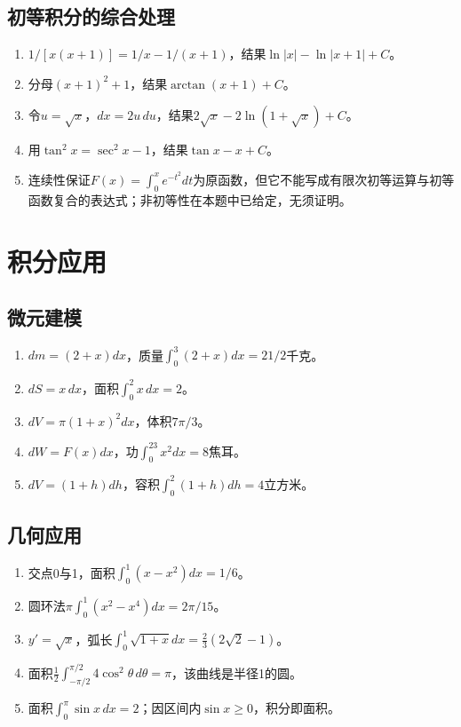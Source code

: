 \documentclass[11pt,a4paper,fontset=fandol]{ctexrep}
\begin{document}
\subsection{初等积分的综合处理}
\begin{enumerate}
\item $1/[x(x+1)]=1/x-1/(x+1)$，结果$\ln|x|-\ln|x+1|+C$。
\item 分母$(x+1)^2+1$，结果$\arctan(x+1)+C$。
\item 令$u=\sqrt x$，$dx=2u\,du$，结果$2\sqrt x-2\ln(1+\sqrt x)+C$。
\item 用$\tan^2x=\sec^2x-1$，结果$\tan x-x+C$。
\item 连续性保证$F(x)=\int_0^xe^{-t^2}dt$为原函数，但它不能写成有限次初等运算与初等函数复合的表达式；非初等性在本题中已给定，无须证明。
\end{enumerate}
\section{积分应用}
\subsection{微元建模}
\begin{enumerate}
\item $dm=(2+x)dx$，质量$\int_0^3(2+x)dx=21/2$千克。
\item $dS=x\,dx$，面积$\int_0^2x\,dx=2$。
\item $dV=\pi(1+x)^2dx$，体积$7\pi/3$。
\item $dW=F(x)dx$，功$\int_0^23x^2dx=8$焦耳。
\item $dV=(1+h)dh$，容积$\int_0^2(1+h)dh=4$立方米。
\end{enumerate}
\subsection{几何应用}
\begin{enumerate}
\item 交点0与1，面积$\int_0^1(x-x^2)dx=1/6$。
\item 圆环法$\pi\int_0^1(x^2-x^4)dx=2\pi/15$。
\item $y'=\sqrt x$，弧长$\int_0^1\sqrt{1+x}dx=\frac23(2\sqrt2-1)$。
\item 面积$\frac12\int_{-\pi/2}^{\pi/2}4\cos^2\theta\,d\theta=\pi$，该曲线是半径1的圆。
\item 面积$\int_0^\pi\sin x\,dx=2$；因区间内$\sin x\ge0$，积分即面积。
\end{enumerate}
\end{document}

